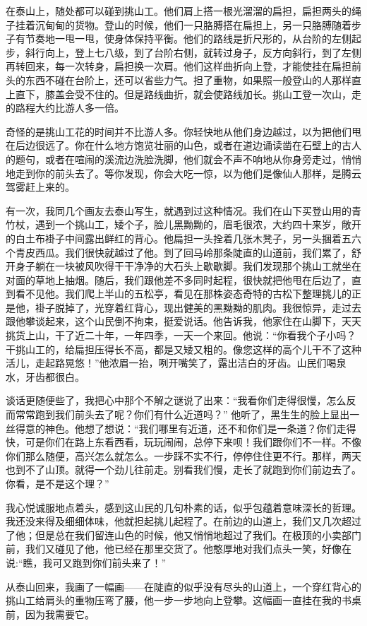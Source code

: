\documentclass[12pt,UTF-8,openany]{ctexbook}
\begin{document}
\begin{Large}
    
    在泰山上，随处都可以碰到挑山工。他们肩上搭一根光溜溜的扁担，扁担两头的绳子挂着沉甸甸的货物。登山的时候，他们一只胳膊搭在扁担上，另一只胳膊随着步子有节奏地一甩一甩，使身体保持平衡。他们的路线是折尺形的，从台阶的左侧起步，斜行向上，登上七八级，到了台阶右侧，就转过身子，反方向斜行，到了左侧再转回来，每一次转身，扁担换一次肩。他们这样曲折向上登，才能使挂在扁担前头的东西不碰在台阶上，还可以省些力气。担了重物，如果照一般登山的人那样直上直下，膝盖会受不住的。但是路线曲折，就会使路线加长。挑山工登一次山，走的路程大约比游人多一倍。
    
    奇怪的是挑山工花的时间并不比游人多。你轻快地从他们身边越过，以为把他们甩在后边很远了。你在什么地方饱览壮丽的山色，或者在道边诵读凿在石壁上的古人的题句，或者在喧闹的溪流边洗脸洗脚，他们就会不声不响地从你身旁走过，悄悄地走到你的前头去了。等你发现，你会大吃一惊，以为他们是像仙人那样，是腾云驾雾赶上来的。
    
    有一次，我同几个画友去泰山写生，就遇到过这种情况。我们在山下买登山用的青竹杖，遇到一个挑山工，矮个子，脸儿黑黝黝的，眉毛很浓，大约四十来岁，敞开的白土布褂子中间露出鲜红的背心。他扁担一头拴着几张木凳子，另一头捆着五六个青皮西瓜。我们很快就越过了他。到了回马岭那条陡直的山道前，我们累了，舒开身子躺在一块被风吹得干干净净的大石头上歇歇脚。我们发现那个挑山工就坐在对面的草地上抽烟。随后，我们跟他差不多同时起程，很快就把他甩在后边了，直到看不见他。我们爬上半山的五松亭，看见在那株姿态奇特的古松下整理挑儿的正是他，褂子脱掉了，光穿着红背心，现出健美的黑黝黝的肌肉。我很惊异，走过去跟他攀谈起来，这个山民倒不拘束，挺爱说话。他告诉我，他家住在山脚下，天天挑货上山，干了近二十年，一年四季，一天一个来回。他说：“你看我个子小吗？干挑山工的，给扁担压得长不高，都是又矮又粗的。像您这样的高个儿干不了这种活儿，走起路晃悠！”他浓眉一抬，咧开嘴笑了，露出洁白的牙齿。山民们喝泉水，牙齿都很白。
    
    谈话更随便些了，我把心中那个不解之谜说了出来：“我看你们走得很慢，怎么反而常常跑到我们前头去了呢？你们有什么近道吗？” 他听了，黑生生的脸上显出一丝得意的神色。他想了想说：“我们哪里有近道，还不和你们是一条道？你们走得快，可是你们在路上东看西看，玩玩闹闹，总停下来呗！我们跟你们不一样。不像你们那么随便，高兴怎么就怎么。一步踩不实不行，停停住住更不行。那样，两天也到不了山顶。就得一个劲儿往前走。别看我们慢，走长了就跑到你们前边去了。你看，是不是这个理？”
    
    我心悦诚服地点着头，感到这山民的几句朴素的话，似乎包蕴着意味深长的哲理。我还没来得及细细体味，他就担起挑儿起程了。在前边的山道上，我们又几次超过了他；但是总在我们留连山色的时候，他又悄悄地超过了我们。在极顶的小卖部门前，我们又碰见了他，他已经在那里交货了。他憨厚地对我们点头一笑，好像在说:“瞧，我可又跑到你们前头来了！”
    
    从泰山回来，我画了一幅画——在陡直的似乎没有尽头的山道上，一个穿红背心的挑山工给肩头的重物压弯了腰，他一步一步地向上登攀。这幅画一直挂在我的书桌前，因为我需要它。
    
\end{Large}
\end{document}
